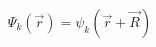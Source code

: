 \documentclass[preview]{standalone}
\begin{document}
\begin{align*}
\Psi_k(\vec{r})= \psi_k(\vec{r}+\vec{R})
\end{align*}
\end{document}

